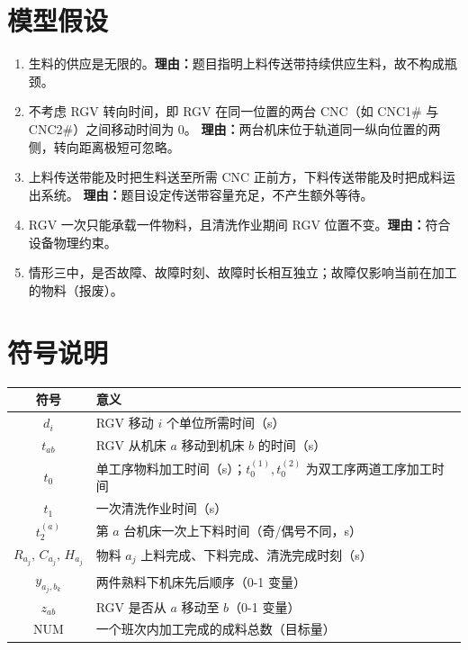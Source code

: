 \documentclass{cumcmthesis}
\begin{document}
\section{模型假设}
\begin{enumerate}
    \item 生料的供应是无限的。\textbf{理由：}题目指明上料传送带持续供应生料，故不构成瓶颈。
    \item 不考虑 RGV 转向时间，即 RGV 在同一位置的两台 CNC（如 CNC1\# 与 CNC2\#）之间移动时间为 0。
          \textbf{理由：}两台机床位于轨道同一纵向位置的两侧，转向距离极短可忽略。
    \item 上料传送带能及时把生料送至所需 CNC 正前方，下料传送带能及时把成料运出系统。
          \textbf{理由：}题目设定传送带容量充足，不产生额外等待。
    \item RGV 一次只能承载一件物料，且清洗作业期间 RGV 位置不变。\textbf{理由：}符合设备物理约束。
    \item 情形三中，是否故障、故障时刻、故障时长相互独立；故障仅影响当前在加工的物料（报废）。
\end{enumerate}

\section{符号说明}
\begin{center}
\begin{tabular}{cl}
    \toprule
    符号 & 意义 \\
    \midrule
    $d_i$          & RGV 移动 $i$ 个单位所需时间（s） \\
    $t_{ab}$       & RGV 从机床 $a$ 移动到机床 $b$ 的时间（s） \\
    $t_0$          & 单工序物料加工时间（s）；$t_0^{(1)},t_0^{(2)}$ 为双工序两道工序加工时间 \\
    $t_1$          & 一次清洗作业时间（s） \\
    $t_2^{(a)}$    & 第 $a$ 台机床一次上下料时间（奇/偶号不同，s） \\
    $R_{a_{j}},\,C_{a_{j}},\,H_{a_{j}}$ & 物料 $a_j$ 上料完成、下料完成、清洗完成时刻（s） \\
    $y_{a_j,b_k}$  & 两件熟料下机床先后顺序（0-1 变量） \\
    $z_{ab}$       & RGV 是否从 $a$ 移动至 $b$（0-1 变量） \\
    $\mathrm{NUM}$ & 一个班次内加工完成的成料总数（目标量） \\
    \bottomrule
\end{tabular}
\end{center}
\end{document}
